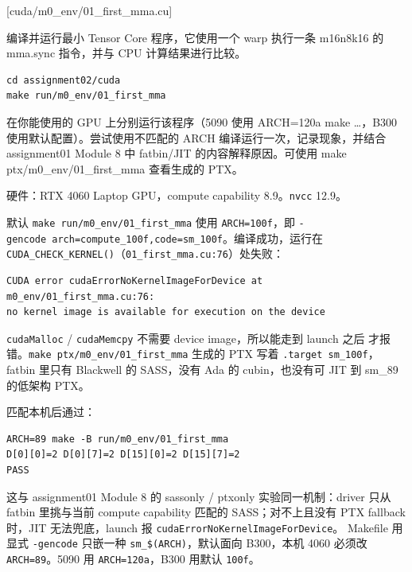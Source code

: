 \documentclass[11pt,a4paper,fontset=fandol]{ctexart}
\begin{document}
[cuda/m0\_env/01\_first\_mma.cu]

编译并运行最小 Tensor Core 程序，它使用一个 warp 执行一条 m16n8k16 的
mma.sync 指令，并与 CPU 计算结果进行比较。

\begin{verbatim}
cd assignment02/cuda
make run/m0_env/01_first_mma
\end{verbatim}

在你能使用的 GPU 上分别运行该程序（5090 使用 ARCH=120a make \ldots，B300
使用默认配置）。尝试使用不匹配的 ARCH 编译运行一次，记录现象，并结合
assignment01 Module 8 中 fatbin/JIT 的内容解释原因。可使用 make
ptx/m0\_env/01\_first\_mma 查看生成的 PTX。

\begin{answer}

硬件：RTX 4060 Laptop GPU，compute capability 8.9。\texttt{nvcc} 12.9。

默认 \texttt{make\ run/m0\_env/01\_first\_mma} 使用
\texttt{ARCH=100f}，即
\texttt{-gencode\ arch=compute\_100f,code=sm\_100f}。编译成功，运行在
\texttt{CUDA\_CHECK\_KERNEL()}（\texttt{01\_first\_mma.cu:76}）处失败：

\begin{verbatim}
CUDA error cudaErrorNoKernelImageForDevice at m0_env/01_first_mma.cu:76:
no kernel image is available for execution on the device
\end{verbatim}

\texttt{cudaMalloc} / \texttt{cudaMemcpy} 不需要 device
image，所以能走到 launch 之后
才报错。\texttt{make\ ptx/m0\_env/01\_first\_mma} 生成的 PTX 写着
\texttt{.target\ sm\_100f}， fatbin 里只有 Blackwell 的 SASS，没有 Ada
的 cubin，也没有可 JIT 到 sm\_89 的低架构 PTX。

匹配本机后通过：

\begin{verbatim}
ARCH=89 make -B run/m0_env/01_first_mma
D[0][0]=2 D[0][7]=2 D[15][0]=2 D[15][7]=2
PASS
\end{verbatim}

这与 assignment01 Module 8 的 sassonly / ptxonly 实验同一机制：driver
只从 fatbin 里挑与当前 compute capability 匹配的 SASS；对不上且没有 PTX
fallback 时，JIT 无法兜底，launch 报
\texttt{cudaErrorNoKernelImageForDevice}。 Makefile 用显式
\texttt{-gencode} 只嵌一种 \texttt{sm\_\$(ARCH)}，默认面向 B300，本机
4060 必须改 \texttt{ARCH=89}。5090 用 \texttt{ARCH=120a}，B300 用默认
\texttt{100f}。

\end{answer}
\end{document}
